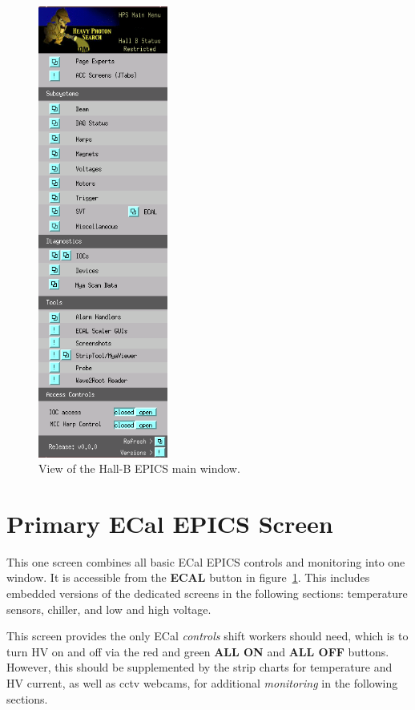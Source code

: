 \documentclass[12pt]{article}
\begin{document}
\begin{figure}[h!]
\center
\includegraphics[width=0.38\textwidth]{pics/hps_epics_2015_09_18.png}
\caption{ \label{EPICSmain} View of the Hall-B EPICS main window.}
\end{figure}

 \onecolumn

 \section{Primary ECal EPICS Screen}
 This one screen combines all basic ECal EPICS controls and monitoring into one window.  It is accessible from the {\bf ECAL} button in figure~\ref{EPICSmain}.  This includes embedded versions of the dedicated screens in the following sections:  temperature sensors, chiller, and low and high voltage.  
 
 This screen provides the only ECal {\em controls} shift workers should need, which is to turn HV on and off via the red and green {\bf ALL ON} and {\bf ALL OFF} buttons.  However, this should be supplemented by the strip charts for temperature and HV current, as well as cctv webcams, for additional {\em monitoring} in the following sections.
\end{document}
